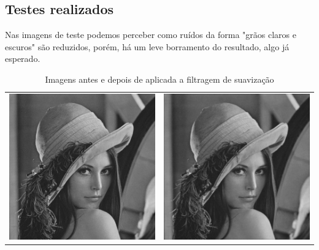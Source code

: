 \documentclass[brazil,times]{abnt}
\begin{document}
		\subsection{Testes realizados}
			Nas imagens de teste podemos perceber como ruídos da forma "grãos claros e escuros" são reduzidos, porém, há um leve borramento do resultado, algo já esperado.
			
			\begin{table}[ht]
			\caption{Imagens antes e depois de aplicada a filtragem de suavização}
			\centering
			\begin{tabular}{|c|c|}
			\hline
			\includegraphics[scale=0.4]{imagens/lena.jpg}&\includegraphics[scale=0.4]{imagens/lena-blur.jpg}\\

\end{tabular}
\end{table}
\end{document}
